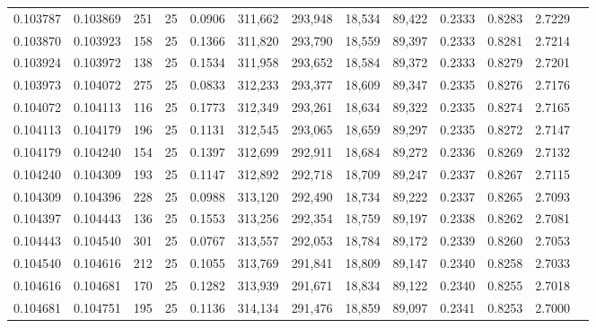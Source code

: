 \begin{tabular}{rrrrrrrrrrrrr}
0.103787 & 0.103869 &   251 &  25 &                                     0.0906 & 311,662 & 293,948 &  18,534 &  89,422 & 0.2333 & 0.8283 & 2.7229 \\
0.103870 & 0.103923 &   158 &  25 &                                     0.1366 & 311,820 & 293,790 &  18,559 &  89,397 & 0.2333 & 0.8281 & 2.7214 \\
0.103924 & 0.103972 &   138 &  25 &                                     0.1534 & 311,958 & 293,652 &  18,584 &  89,372 & 0.2333 & 0.8279 & 2.7201 \\
0.103973 & 0.104072 &   275 &  25 &                                     0.0833 & 312,233 & 293,377 &  18,609 &  89,347 & 0.2335 & 0.8276 & 2.7176 \\
0.104072 & 0.104113 &   116 &  25 &                                     0.1773 & 312,349 & 293,261 &  18,634 &  89,322 & 0.2335 & 0.8274 & 2.7165 \\
0.104113 & 0.104179 &   196 &  25 &                                     0.1131 & 312,545 & 293,065 &  18,659 &  89,297 & 0.2335 & 0.8272 & 2.7147 \\
0.104179 & 0.104240 &   154 &  25 &                                     0.1397 & 312,699 & 292,911 &  18,684 &  89,272 & 0.2336 & 0.8269 & 2.7132 \\
0.104240 & 0.104309 &   193 &  25 &                                     0.1147 & 312,892 & 292,718 &  18,709 &  89,247 & 0.2337 & 0.8267 & 2.7115 \\
0.104309 & 0.104396 &   228 &  25 &                                     0.0988 & 313,120 & 292,490 &  18,734 &  89,222 & 0.2337 & 0.8265 & 2.7093 \\
0.104397 & 0.104443 &   136 &  25 &                                     0.1553 & 313,256 & 292,354 &  18,759 &  89,197 & 0.2338 & 0.8262 & 2.7081 \\
0.104443 & 0.104540 &   301 &  25 &                                     0.0767 & 313,557 & 292,053 &  18,784 &  89,172 & 0.2339 & 0.8260 & 2.7053 \\
0.104540 & 0.104616 &   212 &  25 &                                     0.1055 & 313,769 & 291,841 &  18,809 &  89,147 & 0.2340 & 0.8258 & 2.7033 \\
0.104616 & 0.104681 &   170 &  25 &                                     0.1282 & 313,939 & 291,671 &  18,834 &  89,122 & 0.2340 & 0.8255 & 2.7018 \\
0.104681 & 0.104751 &   195 &  25 &                                     0.1136 & 314,134 & 291,476 &  18,859 &  89,097 & 0.2341 & 0.8253 & 2.7000 \\

\end{tabular}

